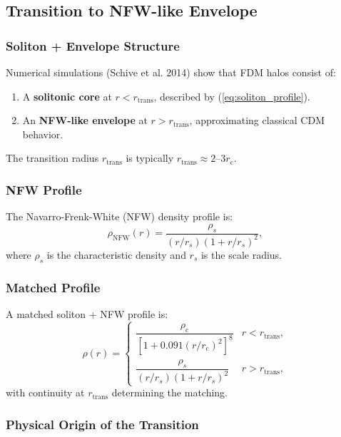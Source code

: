 \documentclass[11pt,a4paper]{article}
\newcommand{\rc}{\ensuremath{r_{\mathrm{c}}}}
\newcommand{\rhoc}{\ensuremath{\rho_{\mathrm{c}}}}
\theoremstyle{definition}
\theoremstyle{remark}
\begin{document}
\subsection{Transition to NFW-like Envelope}
\label{sec:NFW_transition}

\subsubsection{Soliton + Envelope Structure}

Numerical simulations (Schive et al. 2014) show that FDM halos consist of:
\begin{enumerate}
    \item A \textbf{solitonic core} at $r < r_{\mathrm{trans}}$, described by (\ref{eq:soliton_profile}).
    \item An \textbf{NFW-like envelope} at $r > r_{\mathrm{trans}}$, approximating classical CDM behavior.
\end{enumerate}

The transition radius $r_{\mathrm{trans}}$ is typically $r_{\mathrm{trans}} \approx 2\text{--}3 \rc$.

\subsubsection{NFW Profile}

The Navarro-Frenk-White (NFW) density profile is:
\begin{equation}
\rho_{\mathrm{NFW}}(r) = \frac{\rho_s}{(r/r_s)(1 + r/r_s)^2},
\end{equation}
where $\rho_s$ is the characteristic density and $r_s$ is the scale radius.

\subsubsection{Matched Profile}

A matched soliton + NFW profile is:
\begin{equation}
\rho(r) = \begin{cases}
\dfrac{\rhoc}{[1 + 0.091(r/\rc)^2]^8} & r < r_{\mathrm{trans}}, \\[1em]
\dfrac{\rho_s}{(r/r_s)(1 + r/r_s)^2} & r > r_{\mathrm{trans}},
\end{cases}
\end{equation}
with continuity at $r_{\mathrm{trans}}$ determining the matching.

\subsubsection{Physical Origin of the Transition}
\end{document}
